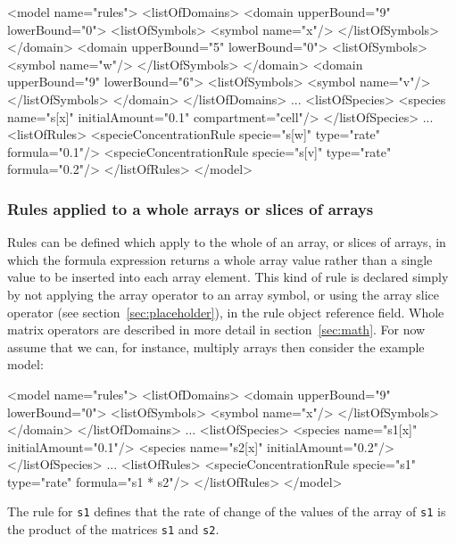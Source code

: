 \documentclass{cekarticle}
\begin{document}
\begin{example}
<model name="rules">
    <listOfDomains>
        <domain upperBound="9" lowerBound="0">
            <listOfSymbols>
                <symbol name="x"/>
            </listOfSymbols>
        </domain>
        <domain upperBound="5" lowerBound="0">
            <listOfSymbols>
                <symbol name="w"/>
            </listOfSymbols>
        </domain>
        <domain upperBound="9" lowerBound="6">
            <listOfSymbols>
                <symbol name="v"/>
            </listOfSymbols>
        </domain>
    </listOfDomains>
    ...
    <listOfSpecies>
        <species name="s[x]" initialAmount="0.1" compartment="cell"/>
    </listOfSpecies>
    ...
    <listOfRules>
        <specieConcentrationRule specie="s[w]" type="rate" formula="0.1"/>
        <specieConcentrationRule specie="s[v]" type="rate" formula="0.2"/>
    </listOfRules>
</model>
\end{example}

\subsubsection{Rules applied to a whole arrays or slices of arrays}

Rules can be defined which apply to the whole of an array, or
slices of arrays, in which the formula expression returns a whole
array value rather than a single value to be inserted into each
array element.  This kind of rule is declared simply by not
applying the array operator to an array symbol, or using the array
slice operator (see section~\ref{sec:placeholder}), in the rule
object reference field.  Whole matrix operators are described in
more detail in section~\ref{sec:math}.  For now assume that we
can, for instance, multiply arrays then consider the example
model:

\begin{example}
<model name="rules">
    <listOfDomains>
        <domain upperBound="9" lowerBound="0">
            <listOfSymbols>
                <symbol name="x"/>
            </listOfSymbols>
        </domain>
    </listOfDomains>
    ...
    <listOfSpecies>
        <species name="s1[x]" initialAmount="0.1"/>
        <species name="s2[x]" initialAmount="0.2"/>
    </listOfSpecies>
    ...
    <listOfRules>
        <specieConcentrationRule specie="s1" type="rate" formula="s1 * s2"/>
    </listOfRules>
</model>
\end{example}

The rule for \texttt{s1} defines that the rate of change of the
values of the array of \texttt{s1} is the product of the matrices
\texttt{s1} and \texttt{s2}.
\end{document}

